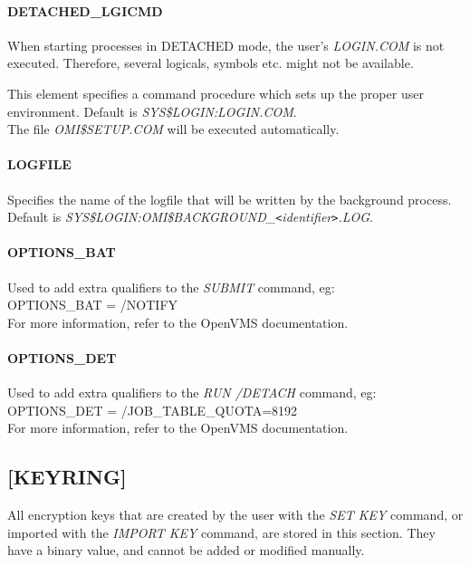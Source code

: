 \documentclass[a4paper]{book}
\newcommand{\lt}{\texttt{<}}
\newcommand{\gt}{\texttt{>}}
\renewcommand{\indent}{\hspace*{5mm}}
\begin{document}
\paragraph{DETACHED{\_}LGICMD}

When starting processes in DETACHED mode, the user's \textsl{LOGIN.COM} is 
not executed. Therefore, several logicals, symbols etc. might not be 
available.

This element specifies a command procedure which sets up the proper user 
environment. Default is \textsl{SYS{\$}LOGIN:LOGIN.COM}. \\
The file \textsl{OMI{\$}SETUP.COM} will be executed automatically.

\paragraph{LOGFILE}

Specifies the name of the logfile that will be written by the background 
process. Default is 
\textsl{SYS{\$}LOGIN:OMI{\$}BACKGROUND{\_}\textit{\lt identifier\gt }.LOG}.

\paragraph{OPTIONS{\_}BAT}

Used to add extra qualifiers to the \textsl{SUBMIT} command, eg:\\
\indent\textsf{OPTIONS{\_}BAT = /NOTIFY} \\
For more information, refer to the OpenVMS documentation.

\paragraph{OPTIONS{\_}DET}

Used to add extra qualifiers to the \textsl{RUN /DETACH} command, eg:\\
\indent\textsf{OPTIONS{\_}DET = /JOB{\_}TABLE{\_}QUOTA=8192} \\
For more information, refer to the OpenVMS documentation.

\subsection{[KEYRING]}
\label{subsubsec:mylabel20}

All encryption keys that are created by the user with the \textsl{SET KEY} command, 
or imported with the \textsl{IMPORT KEY} command, are stored in this section. They 
have a binary value, and cannot be added or modified manually.
\end{document}
